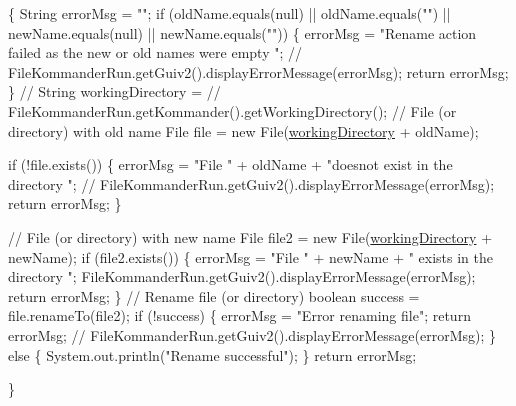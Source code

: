 \begin{DoxyCode}
                                                                \{
        String errorMsg = \textcolor{stringliteral}{""};
        \textcolor{keywordflow}{if} (oldName.equals(null) || oldName.equals(\textcolor{stringliteral}{""}) || newName.equals(null)
                || newName.equals(\textcolor{stringliteral}{""})) \{
            errorMsg = \textcolor{stringliteral}{"Rename action failed as the new or old names were empty
      "};
            \textcolor{comment}{// FileKommanderRun.getGuiv2().displayErrorMessage(errorMsg);}
            \textcolor{keywordflow}{return} errorMsg;
        \}
        \textcolor{comment}{// String workingDirectory =}
        \textcolor{comment}{// FileKommanderRun.getKommander().getWorkingDirectory();}
        \textcolor{comment}{// File (or directory) with old name}
        File file = \textcolor{keyword}{new} File(\hyperlink{classcom_1_1poly_1_1nlp_1_1filekommander_1_1file_1_1actions_1_1_file_action_utils_ad54a8fdc9145d2f423c54cb1597f874a}{workingDirectory} + oldName);

        \textcolor{keywordflow}{if} (!file.exists()) \{
            errorMsg = \textcolor{stringliteral}{"File "} + oldName + \textcolor{stringliteral}{"doesnot exist in the directory "};
            \textcolor{comment}{// FileKommanderRun.getGuiv2().displayErrorMessage(errorMsg);}
            \textcolor{keywordflow}{return} errorMsg;
        \}

        \textcolor{comment}{// File (or directory) with new name}
        File file2 = \textcolor{keyword}{new} File(\hyperlink{classcom_1_1poly_1_1nlp_1_1filekommander_1_1file_1_1actions_1_1_file_action_utils_ad54a8fdc9145d2f423c54cb1597f874a}{workingDirectory} + newName);
        \textcolor{keywordflow}{if} (file2.exists()) \{
            errorMsg = \textcolor{stringliteral}{"File "} + newName + \textcolor{stringliteral}{" exists in the directory "};
            FileKommanderRun.getGuiv2().displayErrorMessage(errorMsg);
            \textcolor{keywordflow}{return} errorMsg;
        \}
        \textcolor{comment}{// Rename file (or directory)}
        \textcolor{keywordtype}{boolean} success = file.renameTo(file2);
        \textcolor{keywordflow}{if} (!success) \{
            errorMsg = \textcolor{stringliteral}{"Error renaming file"};
            \textcolor{keywordflow}{return} errorMsg;
            \textcolor{comment}{// FileKommanderRun.getGuiv2().displayErrorMessage(errorMsg);}
        \} \textcolor{keywordflow}{else} \{
            System.out.println(\textcolor{stringliteral}{"Rename successful"});
        \}
        \textcolor{keywordflow}{return} errorMsg;

    \}
\end{DoxyCode}
